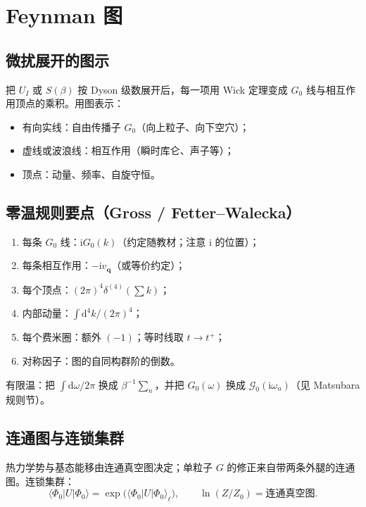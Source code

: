 \section{Feynman 图}

\subsection{微扰展开的图示}

把 $U_I$ 或 $S(\beta)$ 按 Dyson 级数展开后，每一项用 Wick 定理变成 $G_0$ 线与相互作用顶点的乘积。用图表示：
\begin{itemize}
  \item 有向实线：自由传播子 $G_0$（向上粒子、向下空穴）；
  \item 虚线或波浪线：相互作用（瞬时库仑、声子等）；
  \item 顶点：动量、频率、自旋守恒。
\end{itemize}

\subsection{零温规则要点（Gross / Fetter--Walecka）}

\begin{enumerate}
  \item 每条 $G_0$ 线：$\mathrm{i}G_0(k)$（约定随教材；注意 $\mathrm{i}$ 的位置）；
  \item 每条相互作用：$ -\mathrm{i}v_{\mathbf{q}}$（或等价约定）；
  \item 每个顶点：$(2\pi)^4\delta^{(4)}(\sum k)$；
  \item 内部动量：$\int\mathrm{d}^4k/(2\pi)^4$；
  \item 每个费米圈：额外 $(-1)$；等时线取 $t\to t^+$；
  \item 对称因子：图的自同构群阶的倒数。
\end{enumerate}
有限温：把 $\int\mathrm{d}\omega/2\pi$ 换成 $\beta^{-1}\sum_n$，并把 $G_0(\omega)$ 换成 $\mathcal{G}_0(\mathrm{i}\omega_n)$（见 Matsubara 规则节）。

\subsection{连通图与连锁集群}

热力学势与基态能移由连通真空图决定；单粒子 $G$ 的修正来自带两条外腿的连通图。连锁集群：
\begin{equation}
  \langle\Phi_0|U|\Phi_0\rangle
  =\exp\bigl(\langle\Phi_0|U|\Phi_0\rangle_{\ell}\bigr),
  \qquad
  \ln(Z/Z_0)
  =\text{连通真空图}.
\end{equation}

